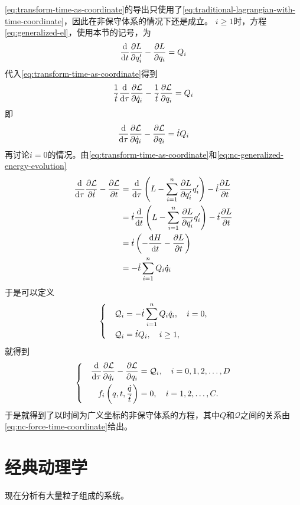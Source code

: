 \documentclass[UTF8, a4paper]{ctexart}
\newenvironment{bigcase}{\left\{\quad\begin{aligned}}{\end{aligned}\right.}
\begin{document}
\eqref{eq:transform-time-as-coordinate}的导出只使用了\eqref{eq:traditional-lagrangian-with-time-coordinate}，因此在非保守体系的情况下还是成立。
$i \geq 1$时，方程\eqref{eq:generalized-el}，使用本节的记号，为
\[
    \dv{t} \pdv{L}{q_i'} - \pdv{L}{q_i} = Q_i
\]
代入\eqref{eq:transform-time-as-coordinate}得到
\[
    \frac{1}{\dot{t}} \dv{\tau} \pdv{\mathcal{L}}{\dot{q}_i} - \frac{1}{\dot{t}} \pdv{\mathcal{L}}{q_i} = Q_i
\]
即
\[
    \dv{\tau} \pdv{\mathcal{L}}{\dot{q}_i} - \pdv{\mathcal{L}}{q_i} = \dot{t} Q_i
\]
再讨论$i=0$的情况。由\eqref{eq:transform-time-as-coordinate}和\eqref{eq:nc-generalized-energy-evolution}
\[
    \begin{aligned}
        \dv{\tau} \pdv{\mathcal{L}}{\dot{t}} - \pdv{\mathcal{L}}{t} &= \dv{\tau} \left( L - \sum_{i=1}^n \pdv{L}{q_i'} q_i' \right) - \dot{t} \pdv{L}{t} \\
        &= \dot{t} \dv{t} \left( L - \sum_{i=1}^n \pdv{L}{q_i'} q_i' \right) - \dot{t} \pdv{L}{t} \\
        &= \dot{t} \left( - \dv{H}{t} - \pdv{L}{t} \right) \\
        &= - \dot{t} \sum_{i=1}^n Q_i \dot{q}_i
    \end{aligned}
\]
于是可以定义
\begin{equation}
    \begin{bigcase}
        \mathcal{Q}_i &= - \dot{t} \sum_{i=1}^n Q_i \dot{q}_i, \quad i = 0, \\
        \mathcal{Q}_i &= \dot{t} Q_i, \quad i \geq 1,
    \end{bigcase}
    \label{eq:nc-force-time-coordinate}
\end{equation}
就得到
\begin{equation}
    \begin{bigcase}
        \dv{\tau} \pdv{\mathcal{L}}{\dot{q}_i} - \pdv{\mathcal{L}}{q_i} &= \mathcal{Q}_i, \quad i = 0, 1, 2, \ldots, D \\
        f_i \left(q, t, \frac{\dot{q}}{\dot{t}}\right) &=0, \quad i = 1, 2, \ldots, C.
    \end{bigcase}
\end{equation}
于是就得到了以时间为广义坐标的非保守体系的方程，其中$Q$和$\mathcal{Q}$之间的关系由\eqref{eq:nc-force-time-coordinate}给出。

\section{经典动理学}

现在分析有大量粒子组成的系统。
\end{document}
